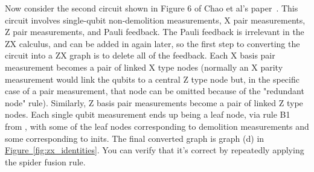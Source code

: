 \documentclass[onecolumn,unpublished,a4paper]{quantumarticle}
\theoremstyle{definition}
\theoremstyle{definition}
\theoremstyle{definition}
\newcommand{\fig}[1]{\hyperref[fig:#1]{Figure~\ref*{fig:#1}}}
\begin{document}
Now consider the second circuit shown in Figure 6 of Chao et al's paper~\cite{chao2020optimization}.
This circuit involves single-qubit non-demolition measurements, X pair measurements, Z pair measurements, and Pauli feedback.
The Pauli feedback is irrelevant in the ZX calculus, and can be added in again later, so the first step to converting the circuit into a ZX graph is to delete all of the feedback.
Each X basis pair measurement becomes a pair of linked X type nodes (normally an X parity measurement would link the qubits to a central Z type node but, in the specific case of a pair measurement, that node can be omitted because of the "redundant node" rule).
Similarly, Z basis pair measurements become a pair of linked Z type nodes.
Each single qubit measurement ends up being a leaf node, via rule B1 from \cite{backens2016simplifiedzx}, with some of the leaf nodes corresponding to demolition measurements and some corresponding to inits.
The final converted graph is graph (d) in \fig{zx_identities}.
You can verify that it's correct by repeatedly applying the spider fusion rule.
\end{document}
